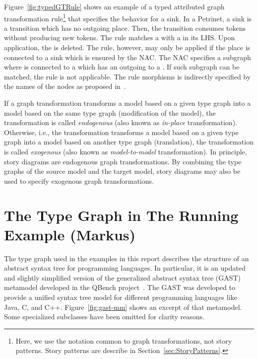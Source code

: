Figure~\ref{fig:typedGTRule} shows an example of a typed attributed graph transformation rule\footnote{Here,
we use the notation common to graph transformations, not story patterns.
Story patterns are describe in Section~\ref{sec:StoryPatterns}.} that specifies the behavior for a sink.
In a Petrinet, a sink is a transition which has no outgoing place.
Then, the transition consumes tokens without producing new tokens.
The rule matches a  with a  in its LHS.
Upon application, the  is deleted.
The rule, however, may only be applied if the place  is connected to a sink which is ensured by the NAC.
The NAC specifies a subgraph where  is connected to a  which has an outgoing  to a .
If such subgraph can be matched, the rule is not applicable.
The rule morphisms is indirectly specified by the names of the nodes as proposed in~\cite{EEPT06}.

If a graph transformation transforms a model based on a given type graph into a model based on the same type graph (modification of the model),
the transformation is called \emph{endogenous} (also known as \emph{in-place} transformation).
Otherwise, i.e., the transformation transforms a model based on a given type graph into a model based on another type graph (translation),
the transformation is called \emph{exogenous} (also known as \emph{model-to-model} transformation).
In principle, story diagrams are endogenous graph transformations.
By combining the type graphs of the source model and the target model, story diagrams may also be used to specify exogenous graph transformations.


\section{The Type Graph in The Running Example (Markus)}
\label{sec:typeGraph}

The type graph used in the examples in this report describes the structure of an abstract syntax tree for programming languages.
In particular, it is an updated and slightly simplified version of the generalized abstract syntax tree (GAST) metamodel developed in the QBench project~\cite{QBench}.
The GAST was developed to provide a unified syntax tree model for different programming languages like Java, C, and C++.
Figure~\ref{fig:gast-mm} shows an excerpt of that metamodel.
Some specialized subclasses have been omitted for clarity reasons.

